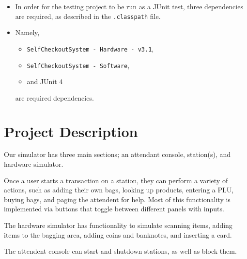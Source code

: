 \documentclass{article}
\begin{document}
    \begin{itemize}

        \item[] In order for the testing project to be run as a JUnit test,
        three dependencies are required, as described in the \texttt{.classpath} file.

        \item[] Namely, 
        \begin{itemize} 
            \item[] \texttt{SelfCheckoutSystem - Hardware - v3.1},
            \item[] \texttt{SelfCheckoutSystem - Software},
            \item[] and JUnit 4 
        \end{itemize}
        are required dependencies.

    \end{itemize}

    \section*{Project Description}

    Our simulator has three main sections; an attendant console, station(s), and hardware simulator.
    
    Once a user starts a transaction on a station, they can perform a variety of actions,
    such as adding their own bags, looking up products, entering a PLU, buying bags, and paging the attendent for help.
    Most of this functionality is implemented via buttons that toggle between different panels with inputs.

    The hardware simulator has functionality to simulate scanning items,
    adding items to the bagging area, adding coins and banknotes, and inserting a card.

    The attendent console can start and shutdown stations, as well as block them.
\end{document}
